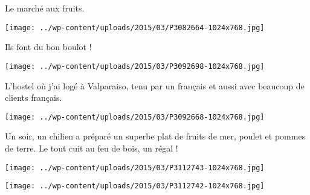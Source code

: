 \pagebreak
Le marché aux fruits.
\begin{center} \texttt{[image: ../wp-content/uploads/2015/03/P3082664-1024x768.jpg]} \end{center}

Ils font du bon boulot !
\begin{center} \texttt{[image: ../wp-content/uploads/2015/03/P3092698-1024x768.jpg]} \end{center}
\vspace{-\topsep}

\pagebreak
 L'hostel où j'ai logé à Valparaiso, tenu par un français et aussi avec beaucoup de clients français.
\begin{center} \texttt{[image: ../wp-content/uploads/2015/03/P3092668-1024x768.jpg]} \end{center}

 Un soir, un chilien a préparé un superbe plat de fruits de mer, poulet et pommes de terre. Le tout cuit au feu de bois, un régal !
\begin{center} \texttt{[image: ../wp-content/uploads/2015/03/P3112743-1024x768.jpg]} \end{center}
\begin{center} \texttt{[image: ../wp-content/uploads/2015/03/P3112742-1024x768.jpg]} \end{center}

